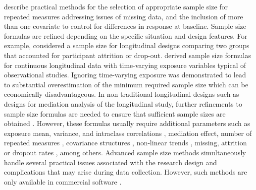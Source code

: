 \cite{Guo_etal(2013)} describe practical methods for the selection of appropriate sample size for repeated measures addressing issues of missing data, and the inclusion of more than one covariate to control for differences in response at baseline. Sample size formulas are refined depending on the specific situation and design features. For example, \cite{Hedeker_Gibbons_Waternaux(1999)} considered a sample size for longitudinal designs comparing two groups that accounted for participant attrition or drop-out. \cite{Basagana_Liao_Spiegelman(2011)} derived sample size formulas for continuous longitudinal data with time-varying exposure variables typical of observational studies. Ignoring time-varying exposure was demonstrated to lead to substantial overestimation of the minimum required sample size which can be economically disadvantageous. In non-traditional longitudinal designs such as designs for mediation analysis of the longitudinal study, further refinements to sample size formulas are needed to ensure that sufficient sample sizes are obtained \citep{Pan_etal(2018)}. However, these formulas usually require additional parameters such as exposure mean, variance, and intraclass correlations \citep{Basagana_Liao_Spiegelman(2011)}, mediation effect, number of repeated measures  \citep{Pan_etal(2018)}, covariance structures \citep{Rochon(1991)}, non-linear trends \citep{Yan_Su(2006)}, missing, attrition or dropout rates \citep{Roy_etal(2007), Lu_Luo_Chen(2008)}, among others.  Advanced sample size methods simultaneously handle several practical issues associated with the research design and complications that may arise during data collection. However, such methods are only available in commercial software \citep{NCSS(2021),nQuery(2021)}. 


